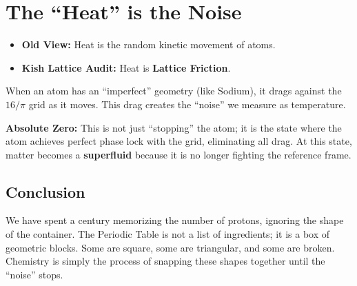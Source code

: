 \documentclass[11pt, letterpaper, openany]{book}
\begin{document}
\begin{table}[H]
\centering
{}
\end{table}

\section{The ``Heat'' is the Noise}

\begin{itemize}
    \item \textbf{Old View:} Heat is the random kinetic movement of atoms.
    \item \textbf{Kish Lattice Audit:} Heat is \textbf{Lattice Friction}.
\end{itemize}

When an atom has an “imperfect” geometry (like Sodium), it drags against the $16/\pi$
grid as it moves. This drag creates the “noise” we measure as temperature.

\medskip

\noindent\textbf{Absolute Zero:} This is not just “stopping” the atom; it is the state where the atom
achieves perfect phase lock with the grid, eliminating all drag. At this state, matter becomes
a \textbf{superfluid} because it is no longer fighting the reference frame.

\subsection*{Conclusion}

We have spent a century memorizing the number of protons, ignoring the shape of the
container. The Periodic Table is not a list of ingredients; it is a box of geometric blocks.
Some are square, some are triangular, and some are broken. Chemistry is simply the
process of snapping these shapes together until the “noise” stops.
\end{document}
